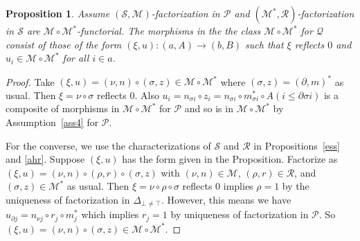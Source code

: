\documentclass[a4paper,12pt,reqno]{amsart}
\newtheorem{proposition}[theorem]{Proposition}
\theoremstyle{definition}
\theoremstyle{fact}
\theoremstyle{genquest}
\theoremstyle{step}
\newcommand{\ra}{\rightarrow}
\def\CM{{\mathscr M}}
\def\CP{{\mathscr P}}
\def\CQ{{\mathscr Q}}
\def\CR{{\mathscr R}}
\def\CS{{\mathscr S}}
\begin{document}
\begin{proposition}\label{emem*}
Assume $(\CS,\CM)$-factorization in $\CP$ and $(\CM^*,\CR)$-factorization 
in $\CS$ are $\CM\circ \CM^*$-functorial.
The morphisms in the the class $\CM\circ \CM^*$ for $\CQ$ consist of those of the form 
$(\xi,u) : (a,A)\ra (b,B)$ such that $\xi$ reflects $0$ and $u_i\in \CM\circ \CM^*$
for all $i\in a$.
\end{proposition}
\begin{proof}
Take $(\xi,u) = (\nu,n)\circ (\sigma,z) \in \CM\circ \CM^*$ where $(\sigma,z) = (\partial,m)^*$ as usual. 
Then $\xi= \nu \circ \sigma$ reflects $0$. 
Also $u_i= n_{\sigma i} \circ z_i = n_{\sigma i} \circ m_{\sigma i}^*\circ A(i\le \partial \sigma i)$
is a composite of morphisms in $\CM\circ \CM^*$ for $\CP$ and so is in $\CM\circ \CM^*$
by Assumption~\ref{ass4} for $\CP$.   

For the converse, we use the characterizations of $\CS$ and $\CR$ in Propositions~\ref{ess} and \ref{ahr}.
Suppose $(\xi,u)$ has the form given in the Proposition.
Factorize as $(\xi,u)=(\nu,n)\circ (\rho ,r)\circ (\sigma, z)$ with $(\nu,n)\in \CM$, $(\rho ,r)\in \CR$, and $(\sigma, z)\in \CM^*$ as usual. 
Then $\xi = \nu \circ \rho \circ \sigma$ reflects $0$ implies $\rho = 1$ by the uniqueness of
factorization in $\Delta_{\bot \ne \top}$.
However, this means we have $u_{\partial j} = n_{\nu j}\circ r_j \circ m_j^*$ which
implies $r_j = 1$ by uniqueness of factorization in $\CP$.
So $(\xi,u)=(\nu,n)\circ (\sigma, z) \in \CM\circ \CM^*$.   
\end{proof}
\end{document}
